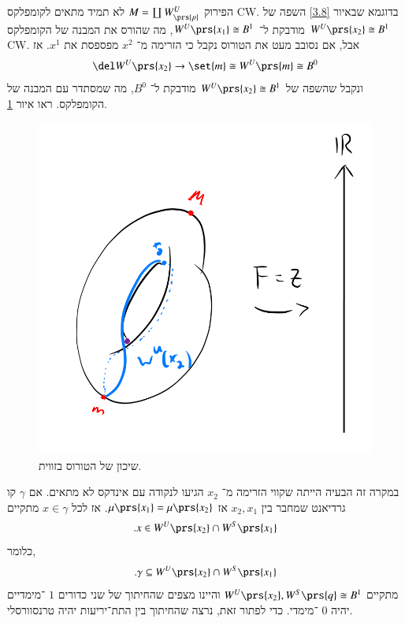 \documentclass[a4paper,10pt,twoside,openany]{book}
\begin{document}
\begin{remark}
הפירוק
$M = \coprod W_{\prs{p}}^U$
לא תמיד מתאים לקומפלקס
\textenglish{CW}.
בדוגמא שבאיור
\ref{3.8}
השפה של
$W^U\prs{x_2} \cong B^1$
מודבקת ל־%
$W^U\prs{x_1} \cong B^1$,
מה שהורס את המבנה של הקומפלקס
\textenglish{CW}.
אבל, אם נסובב מעט את הטורוס נקבל כי הזרימה מ־%
$x^2$
מפספסת את
$x^1$.
אז
\begin{align*}
\del W^U\prs{x_2} \to \set{m} \cong W^U\prs{m} \cong B^0
\end{align*}
ונקבל שהשפה של
$W^U\prs{x_2} \cong B^1$
מודבקת ל־%
$B^0$,
מה שמסתדר עם המבנה של הקומפלקס.
ראו איור
\ref{5.1}.

\begin{figure}
\centering
\includegraphics[scale=0.5]{sources/5.1}
\caption{שיכון של הטורוס בזווית.}
\label{5.1}
\end{figure}

במקרה זה הבעיה הייתה שקווי הזרימה מ־%
$x_2$
הגיעו לנקודה עם אינדקס לא מתאים. אם
$\gamma$
קו גרדיאנט שמחבר בין
$x_2, x_1$
אז
$\mu\prs{x_1} = \mu\prs{x_2}$.
אז לכל
$x \in \gamma$
מתקיים
\[\text{.} x \in W^U\prs{x_2} \cap W^S\prs{x_1}\]
כלומר,
\[\text{.} \gamma \subseteq W^U\prs{x_2} \cap W^S\prs{x_1}\]
מתקיים
$W^U\prs{x_2}, W^S\prs{q} \cong B^1$
והיינו מצפים שהחיתוך של שני כדורים
$1$%
־מימדיים יהיה
$0$%
־מימדי. כדי לפתור זאת, נרצה שהחיתוך בין התת־יריעות יהיה טרנסוורסלי.
\end{remark}
\end{document}
